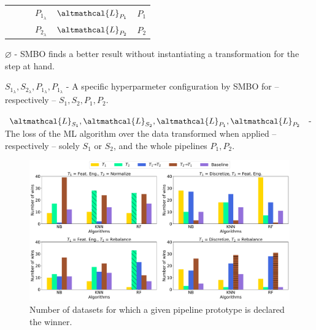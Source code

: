 \begin{table}[t]
\begin{threeparttable}
\begin{tabular}{lp{2.3cm}p{2.3cm}p{2cm}p{2cm}p{2.5cm}}
        & & & $P_{1_{\lambda}}$ & $\altmathcal{L}_{P_1}$ & $P_1$\\
        & & & $P_{2_{\lambda}}$ & $\altmathcal{L}_{P_2}$ & $P_2$\\ \bottomrule
\end{tabular}
\begin{tablenotes}
\footnotesize
\item $\varnothing$ - SMBO finds a better result without instantiating a transformation for the step at hand.
\item $S_{1_{\lambda}}, S_{2_{\lambda}}, P_{1_{\lambda}}, P_{1_{\lambda}}$ - A specific hyperparmeter configuration by SMBO for -- respectively -- $S_{1}, S_{2}, P_{1}, P_{2}$.
\item $\altmathcal{L}_{S_1}, \altmathcal{L}_{S_2}, \altmathcal{L}_{P_1}, \altmathcal{L}_{P_2}$ - The loss of the ML algorithm over the data transformed when applied -- respectively -- solely $S_{1}$ or $S_{2}$, and the whole pipelines $P_{1}, P_{2}$.
\end{tablenotes}
    \label{tbl:validation-rules}
\end{threeparttable}
\end{table}

\begin{figure}[!b]
	\centering
	\includegraphics[width=1.0\textwidth]{chapters/data-centric/supervised/img/experiments_results.pdf}
	\caption{Number of datasets for which a given pipeline prototype is declared the winner.}
	\label{fig:learned-rules-results}
\end{figure}

